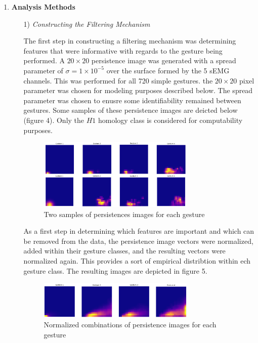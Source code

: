 \documentclass[11pt]{article}
\begin{document}
\begin{enumerate}
\item \textbf{Analysis Methods}

\begin{enumerate}
\item[1)] \textit{Constructing the Filtering Mechanism}

The first step in constructing a filtering mechanism was determining features that were informative with regards to the gesture being performed. A $20 \times 20$ persistence image was generated with a spread parameter of $\sigma = 1\times 10^{-5}$ over the surface formed by the 5 sEMG channels. This was performed for all 720 simple gestures. the $20 \times 20$ pixel parameter was chosen for modeling purposes described below. The spread parameter was chosen to enusre some identifiability remained between gestures. Some samples of these persistence images are deicted below (figure 4). Only the $H1$ homology class is considered for computability purposes.

\begin{figure}[h]
\centering
\includegraphics[width=0.75\textwidth]{persim_smpl}
\caption{Two samples of persistences images for each gesture}
\end{figure}

\newpage

As a first step in determining which features are important and which can be removed from the data, the persistence image vectors were normalized, added within their gesture classes, and the resulting vectors were normalized again. This provides a sort of empirical distribtion within ech gesture class. The resulting images are depicted in figure 5.

\begin{figure}[h]
\centering
\includegraphics[width=0.75\textwidth]{comb_pims}
\caption{Normalized combinations of persistence images for each gesture}
\end{figure}


\end{enumerate}
\end{enumerate}
\end{document}
